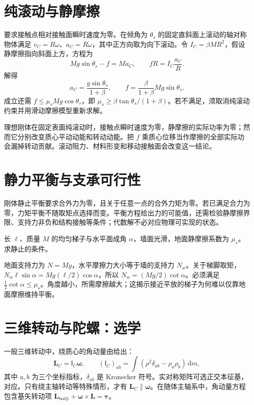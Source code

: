 \documentclass[UTF8,12pt,a4paper,fontset=fandol]{ctexbook}
\begin{document}
\section{纯滚动与静摩擦}
要求接触点相对接触面瞬时速度为零。在倾角为 $\theta_s$ 的固定直斜面上滚动的轴对称物体满足 $v_C=R\omega$、$a_C=R\dot\omega$，其中正方向取为向下滚动。令 $I_C=\beta MR^2$，假设静摩擦指向斜面上方，方程为
\[
 Mg\sin\theta_s-f=Ma_C,\qquad fR=I_C\frac{a_C}{R}.
\]
解得
\begin{equation}
 a_C=\frac{g\sin\theta_s}{1+\beta},\qquad
 f=\frac{\beta}{1+\beta}Mg\sin\theta_s.
 \label{eq:mech-rolling}
\end{equation}
成立还需 $f\le\mu_sMg\cos\theta_s$，即 $\mu_s\ge\beta\tan\theta_s/(1+\beta)$。若不满足，须取消纯滚动约束并用滑动摩擦模型重新求解。

理想刚体在固定表面纯滚动时，接触点瞬时速度为零，静摩擦的实际功率为零；然而它分别改变质心平动动能和转动动能。把 $f$ 乘质心位移当作摩擦的全部实际功会漏掉转动贡献。滚动阻力、材料形变和移动接触面会改变这一结论。

\section{静力平衡与支承可行性}
刚体静止平衡要求合外力为零，且关于任意一点的合外力矩为零。若已满足合力为零，力矩平衡不随取矩点选择而变。平衡方程给出力的可能值，还需检验静摩擦界限、支持力非负和结构接触等条件；代数解不必对应物理可实现的状态。

\begin{example}[靠在光滑墙上的梯子]
长 $\ell$、质量 $M$ 的均匀梯子与水平面成角 $\alpha$，墙面光滑，地面静摩擦系数为 $\mu_s$。求静止的条件。
\end{example}
\begin{solve}
地面支持力为 $N=Mg$，水平摩擦力大小等于墙的支持力 $N_w$。关于梯脚取矩，$N_w\ell\sin\alpha=Mg(\ell/2)\cos\alpha$，所以 $N_w=(Mg/2)\cot\alpha$。必须满足 $\tfrac12\cot\alpha\le\mu_s$。角度越小，所需摩擦越大；这揭示接近平放的梯子为何难以仅靠地面摩擦维持平衡。
\end{solve}

\section{三维转动与陀螺：选学}
一般三维转动中，绕质心的角动量由给出：
\[
 \mathbf L_C=\mathsf I_C\boldsymbol\omega,\qquad
 (\mathsf I_C)_{ab}=\int(\rho^2\delta_{ab}-\rho_a\rho_b)\,\mathrm dm,
\]
其中 $a,b$ 为三个坐标指标，$\delta_{ab}$ 是 Kronecker 符号。实对称矩阵可选正交本征基，对应。只有绕主轴转动等特殊情形，才有 $\mathbf L_C\parallel\boldsymbol\omega$。在随体主轴系中，角动量方程包含基矢转动项 $\dot{\mathbf L}_{\mathrm{body}}+\boldsymbol\omega\times\mathbf L=\boldsymbol\tau$。
\end{document}
